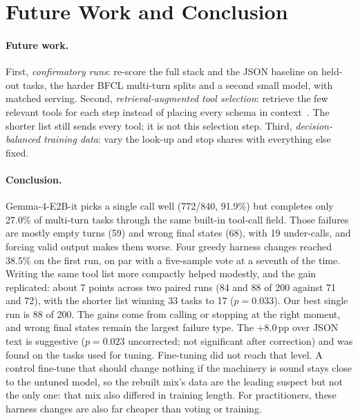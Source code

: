 \documentclass[11pt]{article}
\newcommand{\pp}{\,pp\xspace}
\begin{document}
\section{Future Work and Conclusion}
\label{sec:conclusion}

\paragraph{Future work.} First, \emph{confirmatory runs}: re-score the full stack and the JSON baseline on held-out tasks, the harder BFCL multi-turn splits and a second small model, with matched serving. Second, \emph{retrieval-augmented tool selection}: retrieve the few relevant tools for each step instead of placing every schema in context~\cite{patil2023gorilla,qin2023toolllm}. The shorter list still sends every tool; it is not this selection step. Third, \emph{decision-balanced training data}: vary the look-up and stop shares with everything else fixed.

\paragraph{Conclusion.} Gemma-4-E2B-it picks a single call well (772/840, 91.9\%) but completes only 27.0\% of multi-turn tasks through the same built-in tool-call field. Those failures are mostly empty turns (59) and wrong final states (68), with 19 under-calls, and forcing valid output makes them worse. Four greedy harness changes reached 38.5\% on the first run, on par with a five-sample vote at a seventh of the time. Writing the same tool list more compactly helped modestly, and the gain replicated: about 7 points across two paired runs (84 and 88 of 200 against 71 and 72), with the shorter list winning 33 tasks to 17 ($p=0.033$). Our best single run is 88 of 200. The gains come from calling or stopping at the right moment, and wrong final states remain the largest failure type. The +8.0\pp over JSON text is suggestive ($p=0.023$ uncorrected; not significant after correction) and was found on the tasks used for tuning. Fine-tuning did not reach that level. A control fine-tune that should change nothing if the machinery is sound stays close to the untuned model, so the rebuilt mix's data are the leading suspect but not the only one: that mix also differed in training length. For practitioners, these harness changes are also far cheaper than voting or training.

{\footnotesize\setlength{\bibsep}{1pt}

}
\end{document}
